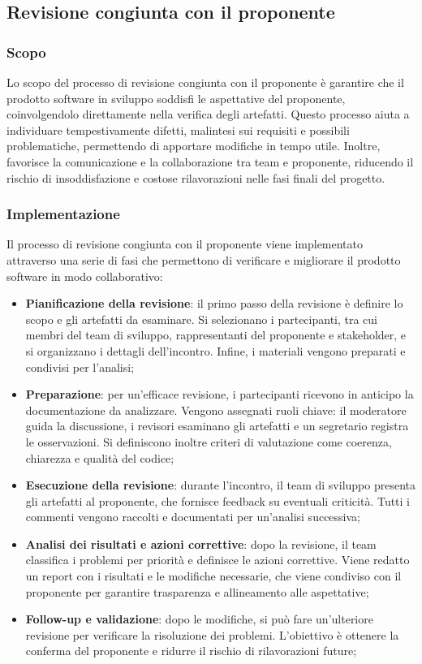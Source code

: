\subsection{Revisione congiunta con il proponente}
\subsubsection{Scopo}
Lo scopo del processo di revisione congiunta con il proponente è garantire che il prodotto software in sviluppo soddisfi le aspettative del proponente, coinvolgendolo direttamente nella verifica degli artefatti. Questo processo aiuta a individuare tempestivamente difetti, malintesi sui requisiti e possibili problematiche, permettendo di apportare modifiche in tempo utile. Inoltre, favorisce la comunicazione e la collaborazione tra team e proponente, riducendo il rischio di insoddisfazione e costose rilavorazioni nelle fasi finali del progetto.

\subsubsection{Implementazione}
Il processo di revisione congiunta con il proponente viene implementato attraverso una serie di fasi che permettono di verificare e migliorare il prodotto software in modo collaborativo:
\begin{itemize}
    \item \textbf{Pianificazione della revisione}: il primo passo della revisione è definire lo scopo e gli artefatti da esaminare. Si selezionano i partecipanti, tra cui membri del team di sviluppo, rappresentanti del proponente e stakeholder, e si organizzano i dettagli dell’incontro. Infine, i materiali vengono preparati e condivisi per l'analisi;
    \item \textbf{Preparazione}: per un’efficace revisione, i partecipanti ricevono in anticipo la documentazione da analizzare. Vengono assegnati ruoli chiave: il moderatore guida la discussione, i revisori esaminano gli artefatti e un segretario registra le osservazioni. Si definiscono inoltre criteri di valutazione come coerenza, chiarezza e qualità del codice;
    \item \textbf{Esecuzione della revisione}: durante l’incontro, il team di sviluppo presenta gli artefatti al proponente, che fornisce feedback su eventuali criticità. Tutti i commenti vengono raccolti e documentati per un'analisi successiva;
    \item \textbf{Analisi dei risultati e azioni correttive}: dopo la revisione, il team classifica i problemi per priorità e definisce le azioni correttive. Viene redatto un report con i risultati e le modifiche necessarie, che viene condiviso con il proponente per garantire trasparenza e allineamento alle aspettative;
    \item \textbf{Follow-up e validazione}: dopo le modifiche, si può fare un'ulteriore revisione per verificare la risoluzione dei problemi. L'obiettivo è ottenere la conferma del proponente e ridurre il rischio di rilavorazioni future;
\end{itemize}

